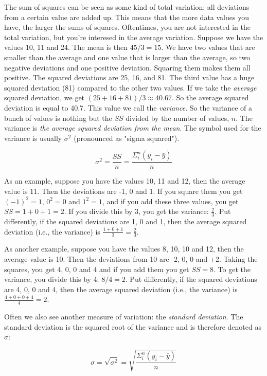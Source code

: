 \documentclass[]{book}\usepackage[]{graphicx}\usepackage[]{color}
\begin{document}
The sum of squares can be seen as some kind of total variation: all deviations from a certain value are added up. This means that the more data values you have, the larger the sums of squares. Oftentimes, you are not interested in the total variation, but you're interesed in the average variation. Suppose we have the values 10, 11 and 24. The mean is then $45/3=15$. We have two values that are smaller than the average and one value that is larger than the average, so two negative deviations and one positive deviation. Squaring them makes them all positive. The squared deviations are 25, 16, and 81. The third value has a huge squared deviation (81) compared to the other two values. If we take the \textit{average} squared deviation, we get $(25+16+81)/3 \approx 40.67$. So the average squared deviation is equal to 40.7. This value we call the \textit{variance}. So the variance of a bunch of values is nothing but the $SS$ divided by the number of values, $n$. The variance is \textit{the average squared deviation from the mean}. The symbol used for the variance is usually $\sigma^2$ (pronounced as "sigma squared").

\begin{equation}
\sigma^2 = \frac{SS}{n}= \frac{\Sigma_i^n (y_i-\bar{y})}{n}
\end{equation}


As an example, suppose you have the values 10, 11 and 12, then the average value is 11. Then the deviations are -1, 0 and 1. If you square them you get $(-1)^2=1$, $0^2=0$ and $1^2=1$, and if you add these three values, you get $SS=1+0+1=2$. If you divide this by 3, you get the variance: $\frac{2}{3}$. Put differently, if the squared deviations are 1, 0 and 1, then the average squared deviation (i.e., the variance) is $\frac{1+0+1}{3}=\frac{2}{3}$.

As another example, suppose you have the values 8, 10, 10 and 12, then the average value is 10. Then the deviations from 10 are -2, 0, 0 and +2. Taking the squares, you get 4, 0, 0 and 4 and if you add them you get $SS=8$. To get the variance, you divide this by 4: $8/4=2$. Put differently, if the squared deviations are 4, 0, 0 and 4, then the average squared deviation (i.e., the variance) is $\frac{4+0+0+4}{4}=2$.

Often we also see another measure of variation: the \textit{standard deviation}. The standard deviation is the squared root of the variance and is therefore denoted as $\sigma$:

\begin{equation}
\sigma = \sqrt{\sigma^2}=\sqrt{  \frac{\Sigma_i^n (y_i-\bar{y})}{n}}
\end{equation}
\end{document}
